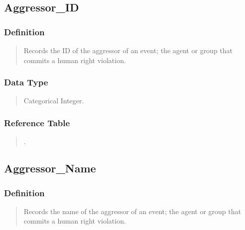 \documentclass[letterpaper,10pt,english]{sphinxmanual}
\begin{document}
\subsection{Aggressor\_ID}
\label{\detokenize{schema_tables:aggressor-id}}

\subsubsection{Definition}
\label{\detokenize{schema_tables:id2}}\begin{quote}

\sphinxAtStartPar
Records the ID of the aggressor of an event; the agent or group that commits a human right violation.
\end{quote}


\subsubsection{Data Type}
\label{\detokenize{schema_tables:id3}}\begin{quote}

\sphinxAtStartPar
Categorical Integer.
\end{quote}


\subsubsection{Reference Table}
\label{\detokenize{schema_tables:id4}}\begin{quote}

\sphinxAtStartPar
{\hyperref[\detokenize{schema_tables:aggressor-table}]{}} .
\end{quote}


\subsection{Aggressor\_Name}
\label{\detokenize{schema_tables:aggressor-name}}

\subsubsection{Definition}
\label{\detokenize{schema_tables:id5}}\begin{quote}

\sphinxAtStartPar
Records the name of the aggressor of an event; the agent or group that commits a human right violation.
\end{quote}
\end{document}
